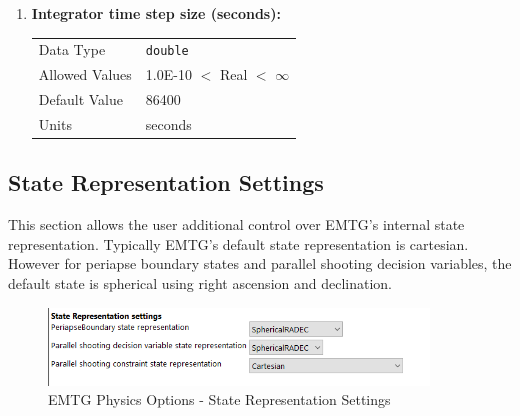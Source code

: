 \begin{enumerate}
        
        \item \textbf{Integrator time step size (seconds):}

            \begin{table}[H]
                \hspace{2cm}
                \begin{tabular}{ll}
                Data Type & \verb|double| \\
                Allowed Values & 1.0E-10 $<$ Real $<$ $\infty$ \\
                Default Value & 86400 \\
                Units & seconds
                \end{tabular}
            \end{table}

    \end{enumerate}

\subsection{State Representation Settings}

    This section allows the user additional control over \ac{EMTG}'s internal state representation. Typically \ac{EMTG}'s default state representation is cartesian. However for periapse boundary states and parallel shooting decision variables, the default state is spherical using right ascension and declination.

    \begin{figure}[H]
        \centering
        \includegraphics[width=0.9\textwidth]{../../shared_latex_inputs/images/pyemtg_physics-state_options.png}
        \caption{EMTG Physics Options - State Representation Settings}
    \end{figure}

